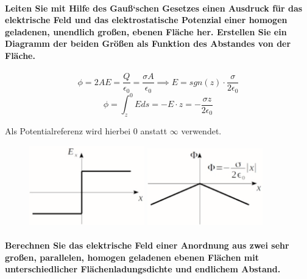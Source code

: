 \documentclass[a4paper, 11pt, parskip=half]{scrartcl}
\begin{document}
\paragraph{Leiten Sie mit Hilfe des Gauß‘schen Gesetzes einen Ausdruck für das elektrische Feld und
das elektrostatische Potenzial einer homogen geladenen, unendlich großen, ebenen Fläche
her. Erstellen Sie ein Diagramm der beiden Größen als Funktion des Abstandes von der
Fläche.}

\begin{equation}
    \phi = 2 A E = \frac{Q}{\epsilon_0} = \frac{\sigma A}{\epsilon_0}
    \implies
    E = sgn(z) \cdot \frac{\sigma}{2 \epsilon_0}
\end{equation}
\begin{equation}
    \phi = \int_{z}^0 E ds = - E \cdot z = - \frac{\sigma z}{2 \epsilon_0}
\end{equation}

Als Potentialreferenz wird hierbei $0$ anstatt $\infty$ verwendet.

\begin{figure}[H]
    \centering
    \begin{minipage}[b]{0.3\textwidth}
        \centering
        \includegraphics[width=5cm]{image/1/10.1}
    \end{minipage}
    \hspace{2cm}
    \begin{minipage}[b]{0.3\textwidth}
        \centering
        \includegraphics[width=5cm]{image/1/10.2}
    \end{minipage}
\end{figure}

\paragraph{Berechnen Sie das elektrische Feld einer Anordnung aus zwei sehr großen, parallelen,
homogen geladenen ebenen Flächen mit unterschiedlicher Flächenladungsdichte und
endlichem Abstand.}
\end{document}
